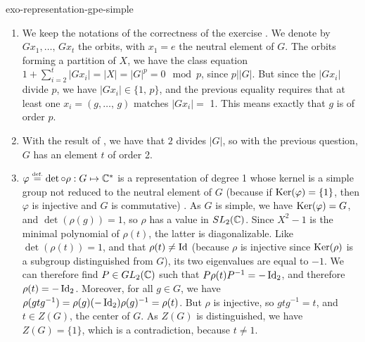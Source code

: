 
\begin{correction}{exo-representation-gpe-simple}
\begin{enumerate}
\item We keep the notations of the correctness of the exercise . We denote by $ G x_1, \ldots, \, G x_t $ the orbits, with $ x_1 = e $ the neutral element of $ G $. The orbits forming a partition of $ X $, we have the class equation $ 1 + \sum_{i = 2}^t{| G x_i |} = | X | = |G|^p = 0 \mod{p} $, since $ p | |G| $. But since the $ | G x_i | $ divide $ p $, we have $ | G x_i | \in \{1, \, p\} $, and the previous equality requires that at least one $ x_i = (g, \ldots, \, g) $ matches $ | G x_i | = $ 1. This means exactly that $ g $ is of order $ p $.
\item With the result of , we have that $ 2 $ divides $ |G| $, so with the previous question, $ G $ has an element $ t $ of order 2.
\item {}   $ \varphi \stackrel{\mbox{\upshape\tiny def.}}{=} \det \circ \rho: G \mapsto \mathbb{C}^* $ is a representation of degree 1 whose kernel is a simple group not reduced to the neutral element of $ G $ (because if $ \operatorname{Ker} (\varphi) = \{1\} $, then $ \varphi $ is injective and $ G $ is commutative) . As $ G $ is simple, we have $ \operatorname{Ker} (\varphi) = G $, and $ \det (\rho (g)) = 1 $, so $ \rho $ has a value in $ SL_2 (\mathbb{C} ) $. Since $ X^2-1 $ is the minimal polynomial of $ \rho (t) $, the latter is diagonalizable. Like $ \det (\rho (t)) = 1 $, and that $ \rho (t) \neq \operatorname{Id} $ (because $ \rho $ is injective since $ \operatorname{Ker} (\rho) $ is a subgroup distinguished from $ G $), its two eigenvalues are equal to $ -1 $. We can therefore find $ P \in GL_2 (\mathbb{C}) $ such that $ P \rho (t) P^{-1} = - \operatorname{Id}_2 $, and therefore $ \rho (t) = - \operatorname{Id}_2 $. Moreover, for all $ g \in G $, we have $ \rho (gtg^{-1}) = \rho (g) (- \operatorname{Id}_2) \rho (g)^{-1} = \rho ( t) $. But $ \rho $ is injective, so $ gtg^{-1} = t $, and $ t \in Z (G) $, the center of $ G $. As $ Z (G) $ is distinguished, we have $ Z (G) = \{1\} $, which is a contradiction, because $ t \neq 1 $.
\end{enumerate}
\end{correction}
 
